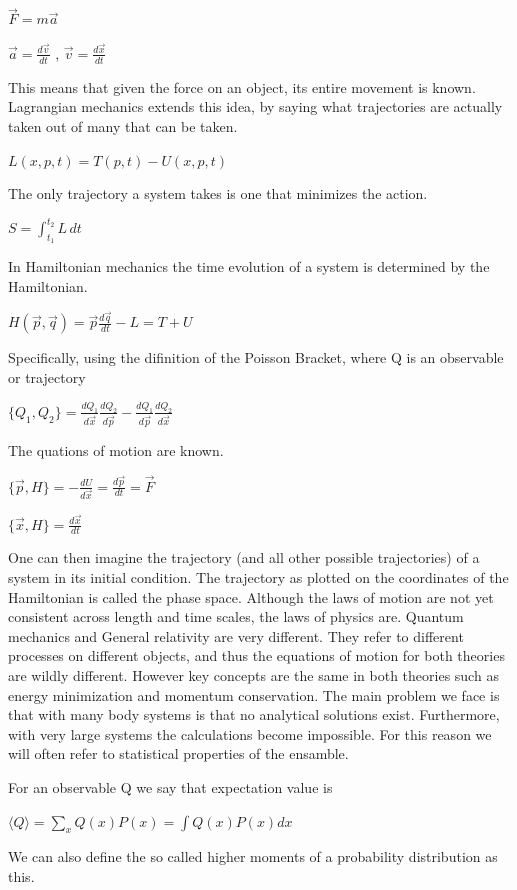 \documentclass[a4paper,11pt,oneside]{book}
\begin{document}
$\vec{F} = m\vec{a}$

$\vec{a} = \frac{d\vec{v}}{dt}$ , $\vec{v} = \frac{d\vec{x}}{dt}$

This means that given the force on an object, its entire movement is known. Lagrangian mechanics extends this idea, by saying what trajectories are actually taken out of many that can be taken.

$L(x, p, t) = T(p, t) - U(x, p, t)$

The only trajectory a system takes is one that minimizes the action.

$S = \int_{t_1}^{t_2} L \, dt$

In Hamiltonian mechanics the time evolution of a system is determined by the Hamiltonian.

$H(\vec{p}, \vec{q}) = \vec{p} \frac{d\vec{q}}{dt} - L = T + U$

Specifically, using the difinition of the Poisson Bracket, where Q is an observable or trajectory

$\{Q_1, Q_2\} = \frac{dQ_1}{d\vec{x}} \frac{dQ_2}{d\vec{p}} - \frac{dQ_1}{d\vec{p}} \frac{dQ_2}{d\vec{x}}$

The quations of motion are known.

$\{\vec{p}, H\} = -\frac{dU}{d\vec{x}} = \frac{d\vec{p}}{dt} = \vec{F}$

$\{\vec{x}, H\} = \frac{d\vec{x}}{dt}$

One can then imagine the trajectory (and all other possible trajectories) of a system in its initial condition. The trajectory as plotted on the coordinates of the Hamiltonian is called the phase space. Although the laws of motion are not yet consistent across length and time scales, the laws of physics are. Quantum mechanics and General relativity are very different. They refer to different processes on different objects, and thus the equations of motion for both theories are wildly different. However key concepts are the same in both theories such as energy minimization and momentum conservation. The main problem we face is that with many body systems is that no analytical solutions exist. Furthermore, with very large systems the calculations become impossible. For this reason we will often refer to statistical properties of the ensamble.

For an observable Q we say that expectation value is

$\langle Q \rangle = \sum_x Q(x)P(x) = \int Q(x)P(x)dx$

We can also define the so called higher moments of a probability distribution as this.
\end{document}
